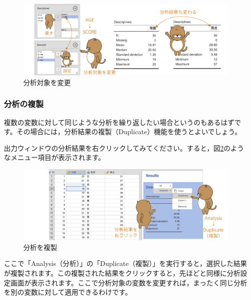 \documentclass[
  12pt,
  a5jpaper,
  lualatex, ja=standard]{bxjsbook}
\begin{document}
\begin{figure}[!ht]

{\centering \includegraphics[width=1\linewidth]{images/basics2/change-var} 

}

\caption{分析対象を変更}\label{fig:bs2-change-var}
\end{figure}

\hypertarget{ux5206ux6790ux306eux8907ux88fd}{%
\subsubsection*{分析の複製}\label{ux5206ux6790ux306eux8907ux88fd}}

複数の変数に対して同じような分析を繰り返したい場合というのもあるはずです。その場合には，分析結果の複製（Duplicate）機能を使うとよいでしょう。

出力ウィンドウの分析結果を右クリックしてみてください。すると，図\ref{fig:bs2-duplicate-analysis}のようなメニュー項目が表示されます。

\begin{figure}[!ht]

{\centering \includegraphics[width=1\linewidth]{images/basics2/duplicate-analysis} 

}

\caption{分析を複製}\label{fig:bs2-duplicate-analysis}
\end{figure}

ここで「Analysis（分析）」の「Duplicate（複製）」を実行すると，選択した結果が複製されます。この複製された結果をクリックすると，先ほどと同様に分析設定画面が表示されます。ここで分析対象の変数を変更すれば，まったく同じ分析を別の変数に対して適用できるわけです。
\end{document}
